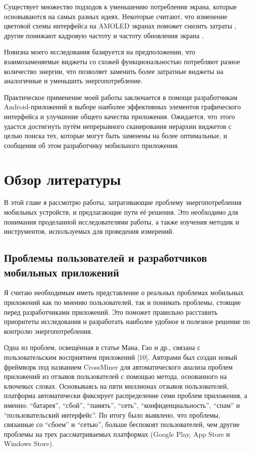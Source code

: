 \documentclass[a4paper,14pt]{extarticle} %
\begin{document}
	Существует множество подходов к уменьшению потребления экрана, которые основываются на самых разных идеях. Некоторые считают, что изменение цветовой схемы интерфейса на AMOLED экранах поможет снизить затраты \parencite{wan2015detecting}, другие понижают кадровую частоту и частоту обновления экрана \parencite{lee2018improving, huang2014intelligent}. 
	
	Новизна моего исследования базируется на предположении, что взаимозаменяемые виджеты со схожей функциональностью потребляют разное количество энергии, что позволяет заменить более затратные виджеты на аналогичные и уменьшить энергопотребление.
	
	Практическое применение моей работы заключается в помощи разработчикам Android-приложений в выборе наиболее эффективных элементов графического интерфейса и улучшение общего качества приложения. Ожидается, что этого удастся достигнуть путём непрерывного сканирования иерархии виджетов с целью поиска тех, которые могут быть заменены на более оптимальные, и сообщения об этом разработчику мобильного приложения.
	
	\newpage
	\section{Обзор литературы} %
	
	В этой главе я рассмотрю работы, затрагивающие проблему энергопотребления мобильных устройств, и предлагающие пути её решения. Это необходимо для понимания проделанной  исследователями работы, а также изучения методик и инструментов, используемых для проведения измерений.
	
	\subsection{Проблемы пользователей и разработчиков мобильных приложений}
	
	Я считаю необходимым иметь представление о реальных проблемах мобильных приложений как по мнению пользователей, так и понимать проблемы, стоящие перед разработчиками приложений. Это поможет правильно расставить приоритеты исследования и разработать наиболее удобное и полезное решение по контролю энергопотребления.
	
	Одна из проблем, освещённая в статье Мана, Гао и др., связана с пользовательским восприятием приложений [10]. Авторами был создан новый фреймворк под названием CrossMiner для автоматического анализа проблем приложений из отзывов пользователей с помощью метода, основанного на ключевых словах. Основываясь на пяти миллионах отзывов пользователей, платформа автоматически фиксирует распределение семи проблем приложения, а именно: “батарея”, “сбой”, “память”, “сеть”, “конфиденциальность”, “спам” и “пользовательский интерфейс”. По итогу было выявлено, что проблемы, связанные со “сбоем” и “сетью”, больше беспокоят пользователей, чем другие проблемы на трех рассматриваемых платформах (Google Play, App Store и Windows Store).
	
\end{document}
